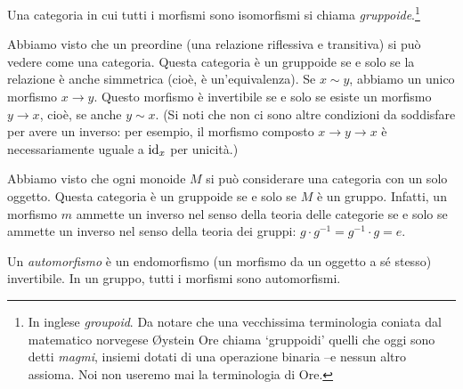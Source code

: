 
\begin{definition}[Gruppoide]\label{def_gruppoide}
 Una categoria in cui tutti i morfismi sono isomorfismi si chiama \emph{gruppoide}.\footnote{In inglese \emph{groupoid}. Da notare che una vecchissima terminologia coniata dal matematico norvegese Øystein Ore chiama `gruppoidi' quelli che oggi sono detti \emph{magmi}, insiemi dotati di una operazione binaria --e nessun altro assioma. Noi non useremo mai la terminologia di Ore.}
\end{definition}
\begin{example}\label{exa_releq_groupoid}
 Abbiamo visto che un preordine (una relazione riflessiva e transitiva) si può vedere come una categoria. Questa categoria è un gruppoide se e solo se la relazione è anche simmetrica (cioè, è un'equivalenza). Se $x\sim y$, abbiamo un unico morfismo $x\to y$. Questo morfismo è invertibile se e solo se esiste un morfismo $y\to x$, cioè, se anche $y\sim x$. (Si noti che non ci sono altre condizioni da soddisfare per avere un inverso: per esempio, il morfismo composto $x\to y\to x$ è necessariamente uguale a $\mathrm{id}_x$ per unicità.)
\end{example}
\begin{example}\label{exa_grp_groupoid}
 Abbiamo visto che ogni monoide $M$ si può considerare una categoria con un solo oggetto. Questa categoria è un gruppoide se e solo se $M$ è un gruppo. Infatti, un morfismo $m$ ammette un inverso nel senso della teoria delle categorie se e solo se ammette un inverso nel senso della teoria dei gruppi: $g\cdot g^{-1}=g^{-1}\cdot g = e$.
\end{example}

Un \emph{automorfismo} è un endomorfismo (un morfismo da un oggetto a sé stesso) invertibile. In un gruppo, tutti i morfismi sono automorfismi.

